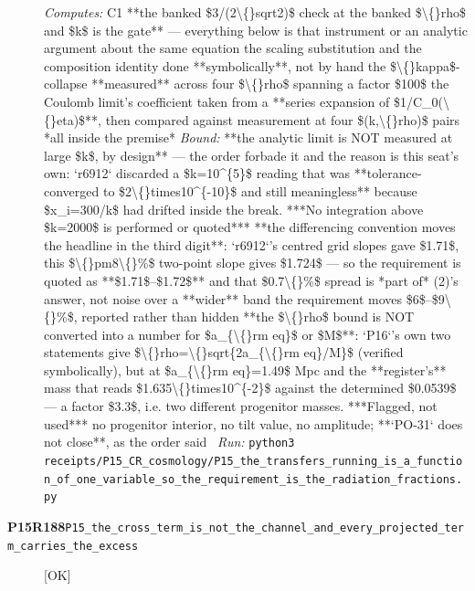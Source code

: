 \begin{description}
\emph{Computes:} C1 **the banked \$3/(2\textbackslash\{\}sqrt2)\$ check at the banked \$\textbackslash\{\}rho\$ and \$k\$ is the gate** --- everything below is that instrument or an analytic argument about the same equation  the scaling substitution and the composition identity done **symbolically**, not by hand  the \$\textbackslash\{\}kappa\$-collapse **measured** across four \$\textbackslash\{\}rho\$ spanning a factor \$100\$  the Coulomb limit's coefficient taken from a **series expansion of \$1/C\_0(\textbackslash\{\}eta)\$**, then compared against measurement at four \$(k,\textbackslash\{\}rho)\$ pairs *all inside the premise*
 \emph{Bound:}  **the analytic limit is NOT measured at large \$k\$, by design** --- the order forbade it and the reason is this seat's own: `r6912` discarded a \$k=10\textasciicircum{}\{5\}\$ reading that was **tolerance-converged to \$2\textbackslash\{\}times10\textasciicircum{}\{-10\}\$ and still meaningless** because \$x\_i=300/k\$ had drifted inside the break. ***No integration above \$k=2000\$ is performed or quoted***  **the differencing convention moves the headline in the third digit**: `r6912`'s centred grid slopes gave \$1.71\$, this \$\textbackslash\{\}pm8\textbackslash\{\}\%\$ two-point slope gives \$1.724\$ --- so the requirement is quoted as **\$1.71\$--\$1.72\$** and that \$0.7\textbackslash\{\}\%\$ spread is *part of* (2)'s answer, not noise  over a **wider** band the requirement moves \$6\$--\$9\textbackslash\{\}\%\$, reported rather than hidden   **the \$\textbackslash\{\}rho\$ bound is NOT converted into a number for \$a\_\{\textbackslash\{\}rm eq\}\$ or \$M\$**: `P16`'s own two statements give \$\textbackslash\{\}rho=\textbackslash\{\}sqrt\{2a\_\{\textbackslash\{\}rm eq\}/M\}\$ (verified symbolically), but at \$a\_\{\textbackslash\{\}rm eq\}=1.49\$ Mpc and the **register's** mass that reads \$1.635\textbackslash\{\}times10\textasciicircum{}\{-2\}\$ against the determined \$0.0539\$ --- a factor \$3.3\$, i.e. two different progenitor masses. ***Flagged, not used***  no progenitor interior, no tilt value, no amplitude; **`PO-31` does not close**, as the order said
\ \emph{Run:} \texttt{python3 receipts/P15\_CR\_cosmology/P15\_the\_transfers\_running\_is\_a\_function\_of\_one\_variable\_so\_the\_requirement\_is\_the\_radiation\_fractions.py}
\item[\rcptlabel{P15_the_cross_term_is_not_the_channel_and_every_projected_term_carries_the_excess}{P15R188}\textbf{P15R188}\quad\texttt{P15\_the\_cross\_term\_is\_not\_the\_channel\_and\_every\_projected\_term\_carries\_the\_excess}]\hfill\textsf{[OK]}\\

\end{description}
